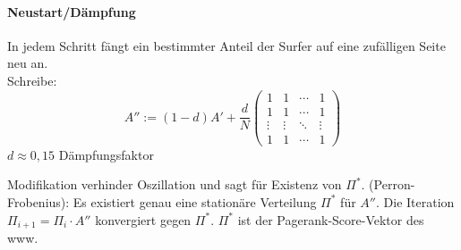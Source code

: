 \paragraph*{Neustart/Dämpfung}
In jedem Schritt fängt ein bestimmter Anteil der Surfer auf eine zufälligen Seite neu an.\\
Schreibe:
\[ A'' := (1 - d) A' + \frac{d}{N} 
            \begin{pmatrix}
                1 & 1 & \cdots & 1 \\
                1 & 1 & \cdots & 1 \\
                \vdots & \vdots & \ddots & \vdots \\
                1 & 1 & \cdots & 1
            \end{pmatrix}\]
            $d \approx 0{,}15$ Dämpfungsfaktor
\begin{center}
\end{center}
Modifikation verhinder Oszillation und sagt für Existenz von $\Pi^*$.
\Satz (Perron-Frobenius): Es existiert genau eine stationäre Verteilung $\Pi^*$ für $A''$. Die Iteration $\Pi_{i+1} = \Pi_{i} \cdot A''$ konvergiert gegen $\Pi^*$. $\Pi^*$ ist der Pagerank-Score-Vektor des www.
